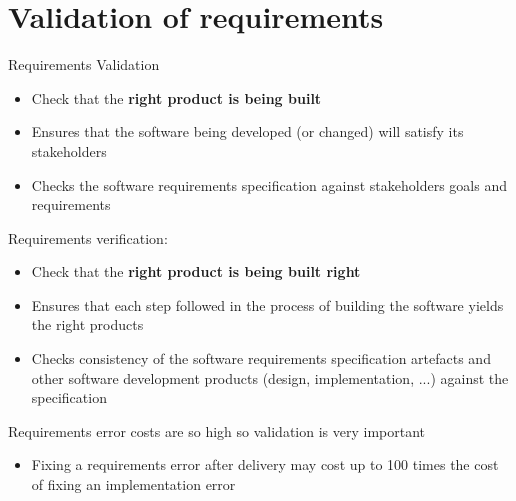 \documentclass{article}[18pt]
\begin{document}
\section{Validation of requirements}
\begin{minipage}{0.8\textwidth}
	
	Requirements Validation
	\begin{itemize}
		\item Check that the \textbf{right product is being built}
		\item Ensures that the software being developed (or changed) will satisfy its stakeholders
		\item Checks the software requirements specification against stakeholders goals and requirements
	\end{itemize}
	Requirements verification:
	\begin{itemize}
		\item Check that the \textbf{right product is being built right}
		\item Ensures that each step followed in the process of building the software yields the right products
		\item Checks consistency of the software requirements specification artefacts and other software development products (design, implementation, ...) against the specification
	\end{itemize}
	Requirements error costs are so high so validation is very important
	\begin{itemize}
		\item Fixing a requirements error after delivery may cost up to 100 times the cost of fixing an implementation error
	\end{itemize}
	
\end{minipage}
\end{document}
